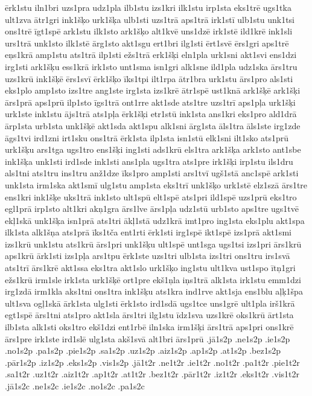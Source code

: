 {ērk1stu
iln1bri
uzs1pra
udz1pla
ilb1stu
izs1kri
ilk1stu
irp1sta
eks1trē
ugs1tka
ult1zva
ātr1gri
ink1šķo
urk1šķa
ulb1sti
uzs1trā
aps1trā
irk1stī
ulb1stu
unk1tsi
ons1trē
īgt1spē
ark1stu
ilk1sto
ark1šķo
alt1kvē
uns1dzē
irk1stē
ild1krē
ink1sli
urs1trā
unk1sto
ilk1stē
ārg1sto
akt1sgu
ert1bri
ilg1sti
ērt1svē
ērs1gri
aps1trē
eņs1krā
amp1stu
ats1trā
ilp1sti
ežs1trā
erk1šķi
eln1pla
urk1sni
akt1svi
ens1dzi
irg1sti
ark1šķu
ess1krā
irk1sto
unt1sma
isn1gri
alk1sne
ild1pla
udz1ska
ārs1tru
uzs1krū
ink1šķē
ērs1svī
ērk1šķo
īks1tpi
ilt1rpa
ātr1bra
urk1stu
ārs1pro
als1sti
eks1plo
amp1sto
izs1tre
ang1ste
irg1sta
izs1krē
ātr1spē
ust1knā
ark1šķē
ark1šķi
ārs1prā
aps1prū
ilp1sto
īgs1trā
ont1rre
akt1sde
ats1tre
uzs1trī
aps1pļa
urk1šķi
urk1ste
ink1stu
ājs1trā
ats1pļa
ērk1šķi
etr1stū
ink1sta
ans1kri
eks1pro
ald1drā
ārp1sta
urb1sta
unk1šķē
akt1sda
akt1spu
alk1sni
ārg1sta
āls1tra
āls1ste
irg1zde
āgs1tvi
ird1zni
irt1sku
ons1trā
ērk1sta
ilp1sta
isn1stū
elk1sni
ilt1sko
ats1prū
urk1šķu
ars1tga
ugs1tro
ens1šķi
ing1sti
ads1krū
els1tra
ark1šķa
ark1sto
ant1sbe
ink1šķa
unk1sti
ird1sde
ink1sti
ans1pla
ugs1tra
ats1pre
irk1šķi
irp1stu
ils1dru
als1tni
ats1tru
ins1tru
anž1dze
īks1pro
amp1sti
ars1tvī
ugš1stā
anc1spē
ark1sti
unk1sta
irm1ska
akt1smī
ulg1stu
amp1sta
eks1trī
unk1šķo
urk1stē
elz1szā
ārs1tre
ens1kri
ink1šķe
uks1trā
ink1sto
ult1spū
elt1spē
ats1pri
ild1spē
uzs1prū
eks1tro
egl1prā
irp1sto
alt1kri
akņ1gra
ārs1lve
ārs1pļa
udz1stū
urb1sto
aps1tre
ugs1tvē
ekļ1skā
unk1šķa
isn1prā
ats1tri
ākļ1stā
udz1krā
imt1pro
ing1sta
eks1plu
akt1spa
ilk1sta
alk1šņa
ats1prā
īks1tča
ent1rti
ērk1sti
irg1spē
ikt1spē
izs1prā
akt1smi
izs1krū
unk1stu
ats1krū
ārs1pri
unk1šķu
ult1spē
unt1sga
ugs1tsi
izs1pri
ārs1krū
aps1krū
ārk1sti
izs1pļa
ars1tpu
ērk1ste
uzs1tri
ulb1sta
izs1tri
ons1tru
irs1svā
ats1trī
ārs1krē
akt1ssa
eks1tra
akt1slo
urk1šķo
ing1stu
ult1kva
ust1spo
ītņ1gri
ežs1krū
irm1sle
irk1sta
urk1šķē
ort1pre
ekš1ņla
iņs1trā
alk1sta
irk1stu
emm1dzi
irg1zdā
irm1kla
aks1tni
ons1tra
ink1šķu
ats1kra
ind1rve
akt1sja
ens1blu
aļķ1špa
ult1sva
ogļ1skā
ārk1sta
ulg1sti
ērk1sto
ird1sdā
ugs1tce
uns1grē
ult1pla
irš1krā
egt1spē
ārs1tni
ats1pro
akt1sla
ārs1tri
ilg1stu
īdz1sva
uzs1krē
oks1krū
ārt1sta
ilb1sta
alk1sti
oks1tro
ekš1dzi
ent1rbē
iln1ska
irm1šķi
ārs1trā
aps1pri
ons1krē
ārs1pre
irk1ste
ird1slē
ulg1sta
akš1svā
alt1bri
ārs1prū
.jā1s2p
.ne1s2p
.ie1s2p
.no1s2p
.pa1s2p
.pie1s2p
.sa1s2p
.uz1s2p
.aiz1s2p
.ap1s2p
.at1s2p
.bez1s2p
.pār1s2p
.iz1s2p
.eks1s2p
.vis1s2p
.jā1t2r
.ne1t2r
.ie1t2r
.no1t2r
.pa1t2r
.pie1t2r
.sa1t2r
.uz1t2r
.aiz1t2r
.ap1t2r
.at1t2r
.bez1t2r
.pār1t2r
.iz1t2r
.eks1t2r
.vis1t2r
.jā1s2c
.ne1s2c
.ie1s2c
.no1s2c
.pa1s2c
}
